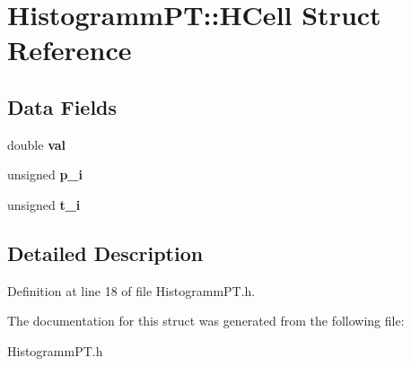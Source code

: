 \section{Histogramm\-P\-T\-:\-:H\-Cell Struct Reference}
\label{structHistogrammPT_1_1HCell}
\subsection*{Data Fields}
\begin{DoxyCompactItemize}
\item 
double {\bfseries val}\label{structHistogrammPT_1_1HCell_a1feacd0780567226c7270ed8ab7fe784}

\item 
unsigned {\bfseries p\-\_\-i}\label{structHistogrammPT_1_1HCell_adb761ef250b282c8bd8ea3068462f51b}

\item 
unsigned {\bfseries t\-\_\-i}\label{structHistogrammPT_1_1HCell_af1baacf510aa664689756a994096a369}

\end{DoxyCompactItemize}


\subsection{Detailed Description}


Definition at line 18 of file Histogramm\-P\-T.\-h.



The documentation for this struct was generated from the following file\-:\begin{DoxyCompactItemize}
\item 
Histogramm\-P\-T.\-h\end{DoxyCompactItemize}

